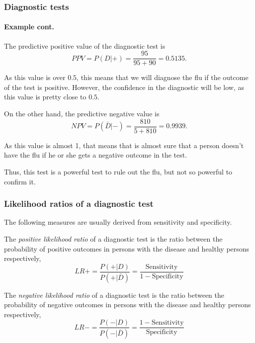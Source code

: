 \begin{frame}
\frametitle{Diagnostic tests}
\framesubtitle{Example cont.}
The predictive positive value of the diagnostic test is
\[
PPV = P(D|+) = \frac{95}{95+90} = 0.5135.
\]

As this value is over $0.5$, this means that we will diagnose the flu if the outcome of the test is positive. 
However, the confidence in the diagnostic will be low, as this value is pretty close to $0.5$.

On the other hand, the predictive negative value is 
\[
NPV = P(\bar D|-) = \frac{810}{5+810} = 0.9939. 
\]

As this value is almost 1, that means that is almost sure that a person doesn't have the flu if he or she gets a
negative outcome in the test. 

Thus, this test is a powerful test to rule out the flu, but not so powerful to confirm it.    
\end{frame}


\begin{frame}
\frametitle{Likelihood ratios of a diagnostic test}
The following measures are usually derived from sensitivity and specificity.
\begin{definition}
The \emph{positive likelihood ratio} of a diagnostic test is the ratio between the probability of positive outcomes in
persons with the disease and healthy persons respectively,
\[
LR+=\frac{P(+|D)}{P(+|\bar D)} = \frac{\mbox{Sensitivity}}{1-\mbox{Specificity}}
\]
\end{definition}

\begin{definition}
The \emph{negative likelihood ratio} of a diagnostic test is the ratio between the probability of negative outcomes in
persons with the disease and healthy persons respectively,
\[
LR-=\frac{P(-|D)}{P(-|\bar D)} = \frac{1-\mbox{Sensitivity}}{\mbox{Specificity}}
\]
\end{definition}
\end{frame}


